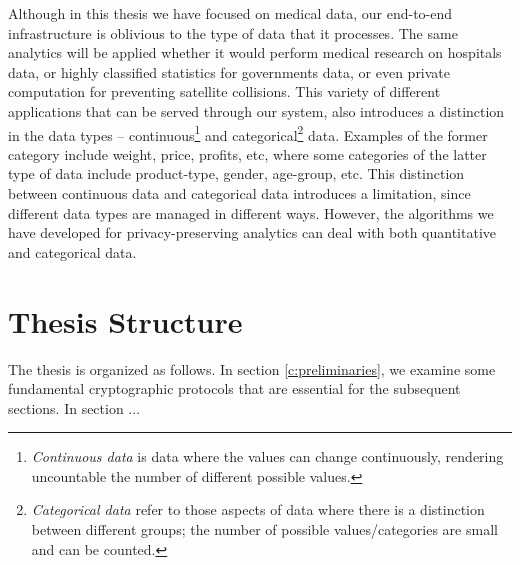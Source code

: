 Although in this thesis we have focused on medical data, our end-to-end infrastructure is oblivious to the type of data that it processes.
The same analytics will be applied whether it would perform medical research on hospitals data, or highly classified statistics for governments data, or even private computation for preventing satellite collisions.
This variety of different applications that can be served through our system, also introduces a distinction in the data types -- continuous\footnote{\textit{Continuous data} is data where the values can change continuously, rendering uncountable the number of different possible values.} and categorical\footnote{\textit{Categorical data} refer to those aspects of data where there is a distinction between different groups; the number of possible values/categories are small and can be counted.} data.
Examples of the former category include weight, price, profits, etc, where some categories of the latter type of data include product-type, gender, age-group, etc.
This distinction between continuous data and categorical data introduces a limitation, since different data types are managed in different ways.
However, the algorithms we have developed for privacy-preserving analytics can deal with both quantitative and categorical data.




\section{Thesis Structure}\label{s:thesis-structure}
The thesis is organized as follows.
In section \ref{c:preliminaries}, we examine some fundamental cryptographic protocols that are essential for the subsequent sections.
In section ...



